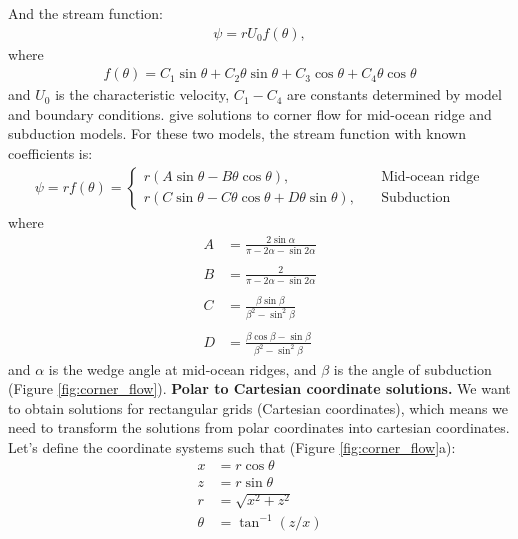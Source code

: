 \documentclass[a4paper,11pt]{article}
\begin{document}
And the stream function:
\begin{align}
\psi = r U_0 f(\theta),
\end{align}
where
\begin{align}
f(\theta) = C_1\sin\theta+C_2\theta\sin\theta+C_3\cos\theta+C_4\theta\cos\theta
\end{align}
and $U_0$ is the characteristic velocity, $C_1-C_4$ are constants determined by model and boundary conditions. \citet{Spiegelman1987} give solutions to corner flow for mid-ocean ridge and subduction models. For these two models, the stream function with known coefficients is:
\begin{align}
\psi = r f(\theta) = 
 \begin{cases}
r(A\sin\theta-B\theta\cos\theta), & \quad \text{Mid-ocean ridge}\\
r(C\sin\theta-C\theta\cos\theta+D\theta\sin\theta), & \quad \text{Subduction}
  \end{cases}
\end{align}
where 
\begin{align}
A&=\frac{\displaystyle 2\sin\alpha}{\displaystyle \pi-2\alpha-\sin2\alpha} \\
&\nonumber  \\
B&=\frac{\displaystyle 2}{\displaystyle \pi-2\alpha-\sin2\alpha} \\
&\nonumber  \\
C&=\frac{\displaystyle \beta\sin\beta}{\displaystyle \beta^2-\sin^2\beta} \\
&\nonumber  \\
D&=\frac{\displaystyle \beta\cos\beta-\sin\beta}{\displaystyle \beta^2-\sin^2\beta}
\end{align}
and $\alpha$ is the wedge angle at mid-ocean ridges, and $\beta$ is the angle of subduction (Figure \ref{fig:corner_flow}).
\newline\newline
\textbf{Polar to Cartesian coordinate solutions.} We want to obtain solutions for rectangular grids (Cartesian coordinates), which means we need to transform the solutions from polar coordinates into cartesian coordinates. Let's define the coordinate systems such that (Figure \ref{fig:corner_flow}a):
\begin{align}
x &= r\cos\theta \\
z &= r\sin\theta \\
r &= \sqrt{x^2+z^2}\\
\theta &= \tan^{-1}({z/x})
\end{align}
\end{document}
